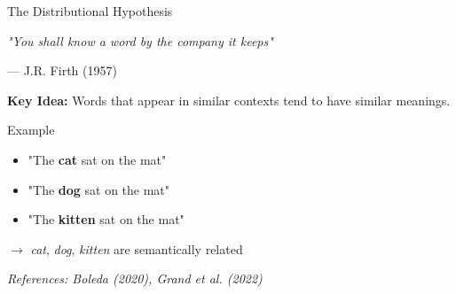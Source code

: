 \documentclass[aspectratio=169]{beamer}
\begin{document}
\begin{frame}{The Distributional Hypothesis 📖}
\begin{center}
\huge
\textit{"You shall know a word by the company it keeps"}
\end{center}

\begin{center}
--- J.R. Firth (1957)
\end{center}

\pause
\vspace{1em}

\textbf{Key Idea:}
Words that appear in similar contexts tend to have similar meanings.

\vspace{1em}

\begin{exampleblock}{Example}
\begin{itemize}\setlength{\itemsep}{0pt}
    \item "The \textbf{cat} sat on the mat"
    \item "The \textbf{dog} sat on the mat"
    \item "The \textbf{kitten} sat on the mat"
\end{itemize}
$\rightarrow$ \textit{cat}, \textit{dog}, \textit{kitten} are semantically related
\end{exampleblock}

\vspace{0.5em}
\small
\textit{References: Boleda (2020), Grand et al. (2022)}
\end{frame}
\end{document}

